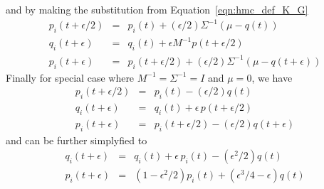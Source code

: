 and by making the substitution from Equation~\ref{eqn:hmc_def_K_G}
\begin{eqnarray}
p_i (t+ \epsilon/2) &=& p_i(t) + (\epsilon/2)\Sigma^{-1}(\mu - q(t)) \\
q_i (t+\epsilon) &=& q_i(t) + \epsilon M^{-1}p(t+ \epsilon/2) \\
p_i (t+\epsilon) &=& p_i(t+ \epsilon/2) + (\epsilon/2)\Sigma^{-1}(\mu - q(t+ \epsilon))
\end{eqnarray}
Finally for special case where $M^{-1}=\Sigma^{-1}=I$ and $\mu=0$, we have
\begin{eqnarray}
p_i (t+ \epsilon/2) &=& p_i(t) - (\epsilon/2)q(t) \\
q_i (t+\epsilon) &=& q_i(t) + \epsilon\,p(t+ \epsilon/2) \\
p_i (t+\epsilon) &=& p_i(t+ \epsilon/2) - (\epsilon/2)q(t+ \epsilon)
\end{eqnarray}
and can be further simplyfied to 
\begin{eqnarray}
q_i (t+\epsilon) &=& q_i(t) + \epsilon\,p_i(t) -  (\epsilon^2/2)q(t)\\
p_i (t+\epsilon) &=& \left(1 - \epsilon^2/2\right)p_i(t) + \left( \epsilon^3/4 -\epsilon \right)q(t)\\
\end{eqnarray}
